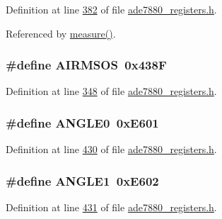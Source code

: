 Definition at line \hyperlink{a00036_source_l00382}{382} of file \hyperlink{a00036_source}{ade7880\-\_\-registers.\-h}.



Referenced by \hyperlink{a00042_source_l00040}{measure()}.

\hypertarget{a00036_a41b8ebb861316f604138d43b9e9fd306}{
\subsubsection[{A\-I\-R\-M\-S\-O\-S}]{\setlength{\rightskip}{0pt plus 5cm}\#define A\-I\-R\-M\-S\-O\-S~0x438\-F}}\label{de/d8c/a00036_a41b8ebb861316f604138d43b9e9fd306}


Definition at line \hyperlink{a00036_source_l00348}{348} of file \hyperlink{a00036_source}{ade7880\-\_\-registers.\-h}.

\hypertarget{a00036_a641f685f54defa54499b05d06ac2c3ef}{
\subsubsection[{A\-N\-G\-L\-E0}]{\setlength{\rightskip}{0pt plus 5cm}\#define A\-N\-G\-L\-E0~0x\-E601}}\label{de/d8c/a00036_a641f685f54defa54499b05d06ac2c3ef}


Definition at line \hyperlink{a00036_source_l00430}{430} of file \hyperlink{a00036_source}{ade7880\-\_\-registers.\-h}.

\hypertarget{a00036_a9b16c8daa98acc491d5f11fe4dd0a3f0}{
\subsubsection[{A\-N\-G\-L\-E1}]{\setlength{\rightskip}{0pt plus 5cm}\#define A\-N\-G\-L\-E1~0x\-E602}}\label{de/d8c/a00036_a9b16c8daa98acc491d5f11fe4dd0a3f0}


Definition at line \hyperlink{a00036_source_l00431}{431} of file \hyperlink{a00036_source}{ade7880\-\_\-registers.\-h}.

